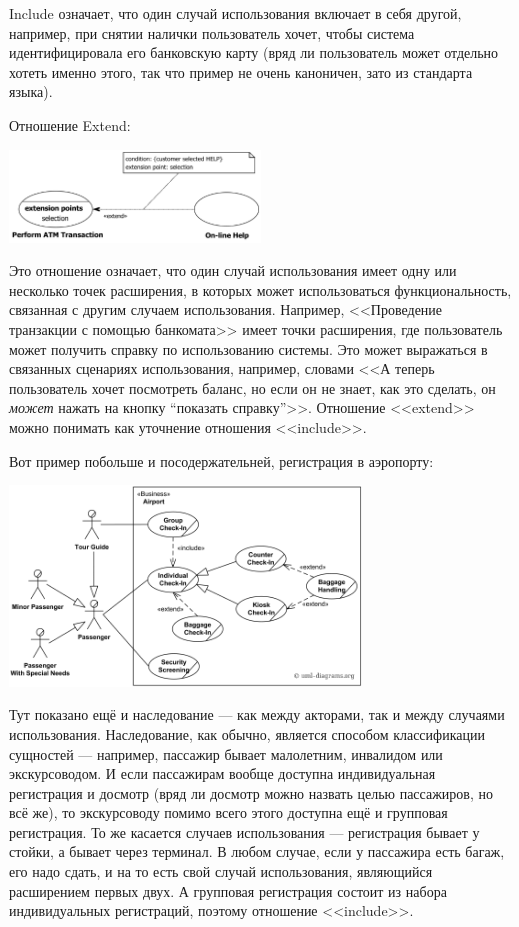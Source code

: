 \documentclass{../../text-style}
\begin{document}
Include означает, что один случай использования включает в себя другой, например, при снятии налички пользователь хочет, чтобы система идентифицировала его банковскую карту (вряд ли пользователь может отдельно хотеть именно этого, так что пример не очень каноничен, зато из стандарта языка).

Отношение Extend:
\begin{center}
    \includegraphics[width=0.5\textwidth]{useCaseExtend.png}
\end{center}

Это отношение означает, что один случай использования имеет одну или несколько точек расширения, в которых может использоваться функциональность, связанная с другим случаем использования. Например, <<Проведение транзакции с помощью банкомата>> имеет точки расширения, где пользователь может получить справку по использованию системы. Это может выражаться в связанных сценариях использования, например, словами <<А теперь пользователь хочет посмотреть баланс, но если он не знает, как это сделать, он \textit{может} нажать на кнопку ``показать справку''>>. Отношение <<extend>> можно понимать как уточнение отношения <<include>>.

Вот пример побольше и посодержательней, регистрация в аэропорту:

\begin{center}
    \includegraphics[width=0.7\textwidth]{airportUseCase.png}
\end{center}

Тут показано ещё и наследование --- как между акторами, так и между случаями использования. Наследование, как обычно, является способом классификации сущностей --- например, пассажир бывает малолетним, инвалидом или экскурсоводом. И если пассажирам вообще доступна индивидуальная регистрация и досмотр (вряд ли досмотр можно назвать целью пассажиров, но всё же), то экскурсоводу помимо всего этого доступна ещё и групповая регистрация. То же касается случаев использования --- регистрация бывает у стойки, а бывает через терминал. В любом случае, если у пассажира есть багаж, его надо сдать, и на то есть свой случай использования, являющийся расширением первых двух. А групповая регистрация состоит из набора индивидуальных регистраций, поэтому отношение <<include>>.
\end{document}
